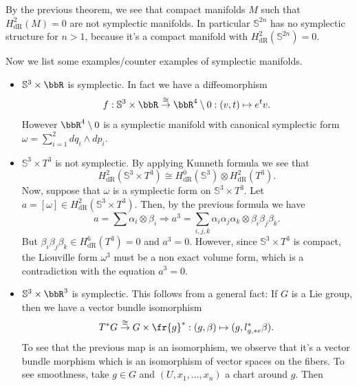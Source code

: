By the previous theorem, we see that compact manifolds $M$ such that $H_{\text{dR}}^2(M)=0$ are not symplectic manifolds.
In particular $\mathbb{S}^{2n}$ has no symplectic structure for $n>1$, because it's a compact manifold with 
$H_{\text{dR}}^2(\mathbb{S}^{2n})=0$.
\begin{example}
    Now we list some examples/counter examples of symplectic manifolds.
    \begin{itemize}
        \item $\mathbb{S}^3\times\bbR$ is symplectic. In fact we have a diffeomorphism
        \begin{equation}
           f: \mathbb{S}^3\times\bbR\overset{\cong}{\rightarrow}\bbR^4\setminus0:(v,t)\mapsto e^tv.
        \end{equation}
        However $\bbR^4\setminus0$ is a symplectic manifold with canonical symplectic form 
        $\omega=\sum_{i=1}^2dq_i\wedge dp_i$.
        \item $\mathbb{S}^3\times T^3$ is not symplectic. By applying Kunneth formula we see that 
        \begin{equation}
            H_{\text{dR}}^2(\mathbb{S}^3\times T^3)\cong H_{\text{dR}}^0(\mathbb{S}^3)\otimes H_{\text{dR}}^2(T^3).
        \end{equation}
        Now, suppose that $\omega$ is a symplectic form on $\mathbb{S}^3\times T^3$. Let $a=[\omega]\in H_{\text{dR}}^2(\mathbb{S}^3\times T^3)$. 
        Then, by the previous formula we have 
        \begin{equation}
            a=\sum \alpha_i\otimes \beta_i\Rightarrow a^3=\sum_{i,j,k}\alpha_i\alpha_j\alpha_k\otimes \beta_i\beta_j\beta_k.
        \end{equation} 
        But $\beta_i\beta_j\beta_k\in H_{\text{dR}}^6(T^3)=0$ and $a^3=0$. However, since $\mathbb{S}^3\times T^3$ is compact, 
        the Liouville form $\omega^3$ must be a non exact volume form, which is a contradiction with the equation $a^3=0$.
        \item $\mathbb{S}^3\times \bbR^3$ is symplectic. This follows from a general fact: If $G$ is a Lie group, then 
        we have a vector bundle isomorphism
        \begin{equation}
            T^*G\overset{\cong}{\rightarrow}G\times\fr{g}^*:(g,\beta)\mapsto (g,l_{g,*e}^*\beta).
        \end{equation}
        To see that the previous map is an isomorphism, we observe that it's a vector bundle morphism which is an isomorphism
        of vector spaces on the fibers. To see smoothness, take $g\in G$ and $(U,x_1,\dots, x_n)$ a chart around $g$. Then 

\end{itemize}
\end{example}
